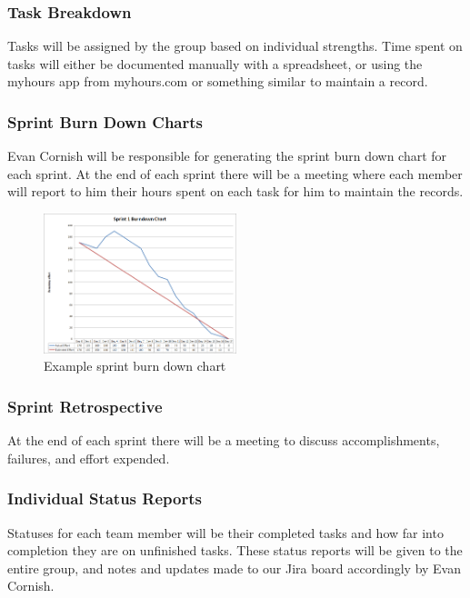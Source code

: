 \subsubsection{Task Breakdown}
Tasks will be assigned by the group based on individual strengths. Time spent on tasks will either be documented manually with a spreadsheet, or using the myhours app from myhours.com or something similar to maintain a record.

\subsubsection{Sprint Burn Down Charts}
Evan Cornish will be responsible for generating the sprint burn down chart for each sprint. At the end of each sprint there will be a meeting where each member will report to him their hours spent on each task for him to maintain the records. 

\begin{figure}[h!]
    \centering
    \includegraphics[width=0.5\textwidth]{images/burndown.png} %
    \caption{Example sprint burn down chart} %
\end{figure}

\subsubsection{Sprint Retrospective}
At the end of each sprint there will be a meeting to discuss accomplishments, failures, and effort expended. 

\subsubsection{Individual Status Reports}
Statuses for each team member will be their completed tasks and how far into completion they are on unfinished tasks. These status reports will be given to the entire group, and notes and updates made to our Jira board accordingly by Evan Cornish.

